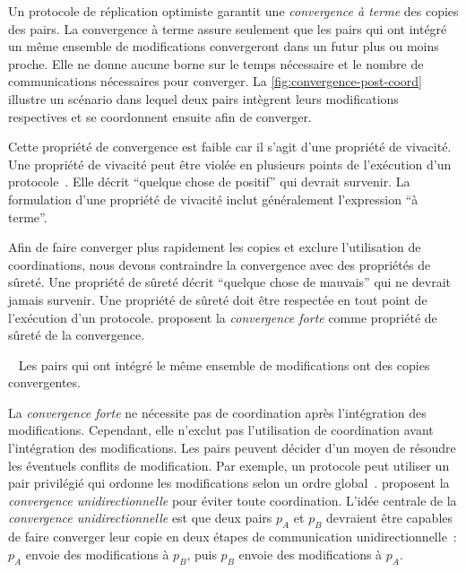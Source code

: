 Un protocole de réplication optimiste garantit une \emph{convergence à terme} des copies des pairs.
La convergence à terme assure seulement que les pairs qui ont intégré un même ensemble de modifications convergeront dans un futur plus ou moins proche.
Elle ne donne aucune borne sur le temps nécessaire et le nombre de communications nécessaires  pour converger.
La \autoref{fig:convergence-post-coord} illustre un scénario dans lequel deux pairs intègrent leurs modifications respectives et se coordonnent ensuite afin de converger.

Cette propriété de convergence est faible car il s'agit d'une propriété de vivacité.
Une propriété de vivacité peut être violée en plusieurs points de l'exécution d'un protocole~\autocite{alpern_liveness_1985}.
Elle décrit \enquote{quelque chose de positif} qui devrait survenir.
La formulation d'une propriété de vivacité inclut généralement l'expression \enquote{à terme}.

Afin de faire converger plus rapidement les copies et exclure l'utilisation de coordinations, nous devons contraindre la convergence avec des propriétés de sûreté.
Une propriété de sûreté décrit \enquote{quelque chose de mauvais} qui ne devrait jamais survenir.
Une propriété de sûreté doit être respectée en tout point de l'exécution d'un protocole.
\textcite{shapiro_2011_crdt} proposent la \emph{convergence forte} comme propriété de sûreté de la convergence.

\begin{definition}~\autocite{shapiro_2011_crdt}\label{def:strong-convergence}
Les pairs qui ont intégré le même ensemble de modifications ont des copies convergentes.
\end{definition}

La \emph{convergence forte} ne nécessite pas de coordination après l'intégration des modifications.
Cependant, elle n'exclut pas l'utilisation de coordination avant l'intégration des modifications.
Les pairs peuvent décider d'un moyen de résoudre les éventuels conflits de modification.
Par exemple, un protocole peut utiliser un pair privilégié qui ordonne les modifications selon un ordre global~\autocite{terry_bayou_1995}.
\textcite{mahajan_2011_cac} proposent la \emph{convergence unidirectionnelle} pour éviter toute coordination.
L'idée centrale de la \emph{convergence unidirectionnelle} est que deux pairs $p_A$ et $p_B$ devraient être capables de faire converger leur copie en deux étapes de communication unidirectionnelle~: $p_A$ envoie des modifications à $p_B$, puis $p_B$ envoie des modifications à $p_A$.

